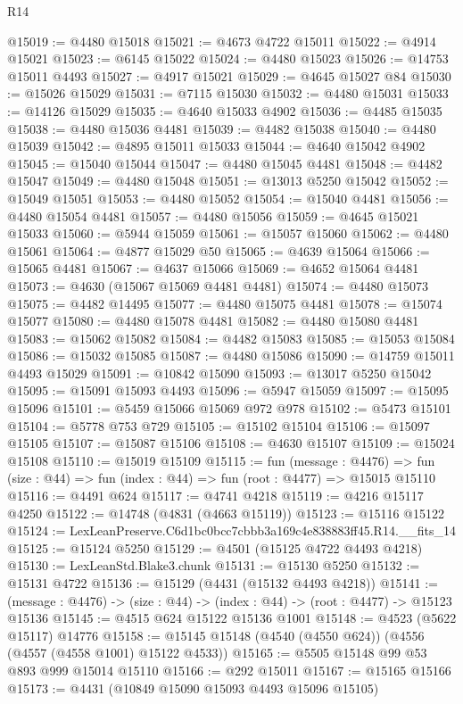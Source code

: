 \begin{lexlean}{R14}
\begin{coremodule}
@15019 := @4480 @15018
@15021 := @4673 @4722 @15011
@15022 := @4914 @15021
@15023 := @6145 @15022
@15024 := @4480 @15023
@15026 := @14753 @15011 @4493
@15027 := @4917 @15021
@15029 := @4645 @15027 @84
@15030 := @15026 @15029
@15031 := @7115 @15030
@15032 := @4480 @15031
@15033 := @14126 @15029
@15035 := @4640 @15033 @4902
@15036 := @4485 @15035
@15038 := @4480 @15036 @4481
@15039 := @4482 @15038
@15040 := @4480 @15039
@15042 := @4895 @15011 @15033
@15044 := @4640 @15042 @4902
@15045 := @15040 @15044
@15047 := @4480 @15045 @4481
@15048 := @4482 @15047
@15049 := @4480 @15048
@15051 := @13013 @5250 @15042
@15052 := @15049 @15051
@15053 := @4480 @15052
@15054 := @15040 @4481
@15056 := @4480 @15054 @4481
@15057 := @4480 @15056
@15059 := @4645 @15021 @15033
@15060 := @5944 @15059
@15061 := @15057 @15060
@15062 := @4480 @15061
@15064 := @4877 @15029 @50
@15065 := @4639 @15064
@15066 := @15065 @4481
@15067 := @4637 @15066
@15069 := @4652 @15064 @4481
@15073 := @4630 (@15067 @15069 @4481 @4481)
@15074 := @4480 @15073
@15075 := @4482 @14495
@15077 := @4480 @15075 @4481
@15078 := @15074 @15077
@15080 := @4480 @15078 @4481
@15082 := @4480 @15080 @4481
@15083 := @15062 @15082
@15084 := @4482 @15083
@15085 := @15053 @15084
@15086 := @15032 @15085
@15087 := @4480 @15086
@15090 := @14759 @15011 @4493 @15029
@15091 := @10842 @15090
@15093 := @13017 @5250 @15042
@15095 := @15091 @15093 @4493
@15096 := @5947 @15059
@15097 := @15095 @15096
@15101 := @5459 @15066 @15069 @972 @978
@15102 := @5473 @15101
@15104 := @5778 @753 @729
@15105 := @15102 @15104
@15106 := @15097 @15105
@15107 := @15087 @15106
@15108 := @4630 @15107
@15109 := @15024 @15108
@15110 := @15019 @15109
@15115 := fun (message : @4476) =>
  fun (size : @44) => fun (index : @44) => fun (root : @4477) => @15015 @15110
@15116 := @4491 @624
@15117 := @4741 @4218
@15119 := @4216 @15117 @4250
@15122 := @14748 (@4831 (@4663 @15119))
@15123 := @15116 @15122
@15124 := LexLeanPreserve.C6d1bc0bcc7cbbb3a169c4e838883ff45.R14.__fits_14
@15125 := @15124 @5250
@15129 := @4501 (@15125 @4722 @4493 @4218)
@15130 := LexLeanStd.Blake3.chunk
@15131 := @15130 @5250
@15132 := @15131 @4722
@15136 := @15129 (@4431 (@15132 @4493 @4218))
@15141 := (message : @4476) -> (size : @44) -> (index : @44) -> (root : @4477) -> @15123 @15136
@15145 := @4515 @624 @15122 @15136 @1001
@15148 := @4523 (@5622 @15117) @14776
@15158 := @15145 @15148 (@4540 (@4550 @624)) (@4556 (@4557 (@4558 @1001) @15122 @4533))
@15165 := @5505 @15148 @99 @53 @893 @999 @15014 @15110
@15166 := @292 @15011
@15167 := @15165 @15166
@15173 := @4431 (@10849 @15090 @15093 @4493 @15096 @15105)

\end{coremodule}
\end{lexlean}
